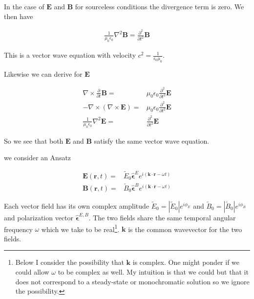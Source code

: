 \documentclass[12pt]{article}
\newcommand{\ep}{\epsilon}
\renewcommand{\vec}[1]{\boldsymbol{#1}}
\newcommand{\unitvec}[1]{\hat{\boldsymbol{#1}}}
\begin{document}
In the case of $\vec{E}$ and $\vec{B}$ for sourceless conditions the divergence term is zero.
We then have

\begin{align}
\frac{1}{\mu_0 \ep_0} \nabla^2 \vec{B} = \frac{\partial^2}{\partial t^2} \vec{B}
\end{align}

This is a vector wave equation with velocity $c^2 = \frac{1}{\ep_0 \mu_0}$.

Likewise we can derive for $\vec{E}$

\begin{align}
\nabla \times \frac{\partial}{\partial t}\vec{B} =& \mu_0\ep_0 \frac{\partial^2}{\partial t^2}\vec{E}\\
-\nabla \times (\nabla \times \vec{E}) =& \mu_0 \ep_0 \frac{\partial^2}{\partial t^2} \vec{E}\\
\frac{1}{\mu_0 \ep_0} \nabla^2 \vec{E} =& \frac{\partial^2}{\partial t^2} \vec{E}
\end{align}

So we see that both $\vec{E}$ and $\vec{B}$ satisfy the same vector wave equation.

we consider an Ansatz

\begin{align}
\vec{E}(\vec{r},t) =& \tilde{E}_0 \unitvec{\ep}^E e^{i(\vec{k}\cdot\vec{r} - \omega t)}\\
\vec{B}(\vec{r},t) =& \tilde{B}_0 \unitvec{\ep}^B e^{i(\vec{k}\cdot\vec{r} - \omega t)}
\end{align}

Each vector field has its own complex amplitude $\tilde{E}_0 = |\tilde{E}_0|e^{i\phi_E}$ and $\tilde{B}_0 = |\tilde{B}_0|e^{i\phi_B}$ and polarization vector $\unitvec{\ep}^{E,B}$.
The two fields share the same temporal angular frequency $\omega$ which we take to be real\footnote{Below I consider the possibility that $\vec{k}$ is complex. One might ponder if we could allow $\omega$ to be complex as well. My intuition is that we could but that it does not correspond to a steady-state or monochromatic solution so we ignore the possibility.}.
$\vec{k}$ is the common wavevector for the two fields.
\end{document}
